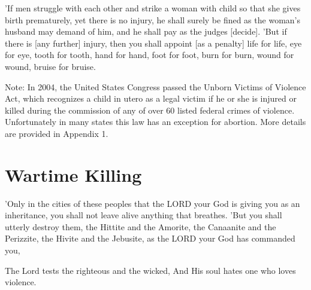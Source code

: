 \begin{scripture}[Exodus 21:22-25]
    'If men struggle with each other and strike a woman with child so that she gives birth prematurely, yet there is no injury, he shall surely be fined as the woman's husband may demand of him, and he shall pay as the judges [decide].
    'But if there is [any further] injury, then you shall appoint [as a penalty] life for life,
    eye for eye, tooth for tooth, hand for hand, foot for foot,
    burn for burn, wound for wound, bruise for bruise.
\end{scripture}
\vspace{3\baselineskip}

\begin{small}
Note: In 2004, the United States Congress passed the Unborn Victims of Violence Act, which recognizes a child in
utero as a legal victim if he or she is injured or killed during the commission of any of over 60 listed federal crimes of violence. Unfortunately in many
states this law has an exception for abortion. More details are provided in Appendix 1.
\end{small}

\newpage
\section{Wartime Killing}
\begin{scripture}[Deuteronomy 20:16-17]
    'Only in the cities of these peoples that the LORD your God is giving you as an inheritance, you shall not leave alive anything that breathes.
    'But you shall utterly destroy them, the Hittite and the Amorite, the Canaanite and the Perizzite, the Hivite and the Jebusite, as the LORD your God has commanded you,
\end{scripture}


\vspace{2\baselineskip}


\begin{scripture}[Psalm 11:5]
    The Lord tests the righteous and the wicked, And His soul hates one who loves violence.
\end{scripture}

